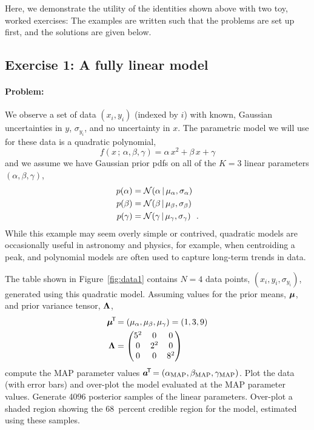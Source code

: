 Here, we demonstrate the utility of the identities shown above with two toy,
worked exercises: The examples are written such that the problems are set up
first, and the solutions are given below.


\subsection{Exercise 1: A fully linear model}

\paragraph{Problem:} We observe a set of data $(x_i, y_i)$ (indexed by $i$) with
known, Gaussian uncertainties in $y$, $\sigma_{y_i}$, and no uncertainty in $x$.
The parametric model we will use for these data is a quadratic polynomial,
\begin{equation}
  f(x \,;\, \alpha, \beta, \gamma) = \alpha\,x^2 + \beta\,x + \gamma
\end{equation}
and we assume we have Gaussian prior pdfs on all of the $K=3$ linear parameters
$(\alpha, \beta, \gamma)$,
\begin{align}
  p(\alpha) &= \mathcal{N}\!\,(\alpha \,|\, \mu_\alpha, \sigma_\alpha)\\
  p(\beta) &= \mathcal{N}\!\,(\beta \,|\, \mu_\beta, \sigma_\beta)\\
  p(\gamma) &= \mathcal{N}\!\,(\gamma \,|\, \mu_\gamma, \sigma_\gamma)
  ~~.
\end{align}
While this example may seem overly simple or contrived, quadratic models are
occasionally useful in astronomy and physics, for example, when centroiding a
peak, and polynomial models are often used to capture long-term trends in data.

The table shown in Figure~\ref{fig:data1} contains $N=4$ data points, $(x_i,
y_i, \sigma_{y_i})$, generated using this quadratic model.
Assuming values for the prior means, $\boldsymbol{\mu}$, and prior variance tensor,
$\mathbf{\Lambda}$,
\begin{align}
  \boldsymbol{\mu}^{\!\mathsf{T}\!} &= (\mu_\alpha, \mu_\beta, \mu_\gamma) = (1, 3, 9)\\
  \mathbf{\Lambda} &=
    \begin{pmatrix}
      5^2 & 0 & 0\\
      0 & 2^2 & 0\\
      0 & 0 & 8^2
    \end{pmatrix}
\end{align}
compute the MAP parameter values $\boldsymbol{a}^{\!\mathsf{T}\!} = (\alpha_{\rm MAP}, \beta_{\rm MAP},
\gamma_{\rm MAP})$.
Plot the data (with error bars) and over-plot the model evaluated at the
MAP parameter values.
Generate 4096 posterior samples of the linear parameters.
Over-plot a shaded region showing the 68~percent credible region for the model,
estimated using these samples.

